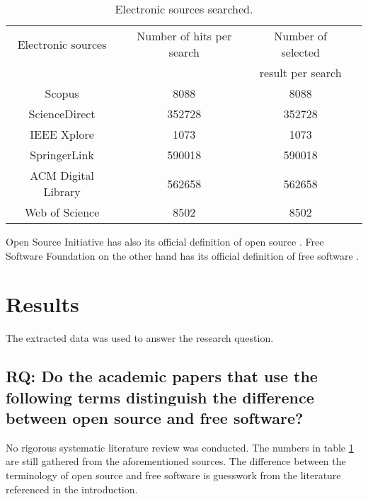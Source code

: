 \documentclass[conference]{IEEEtran}
\begin{document}
\begin{table}[htbp]
	\caption{Electronic sources searched.}
	\begin{center}
		\begin{tabular}{|c|c|c|c|}
			\hline
				Electronic sources & Number of hits per search & Number of selected\\
				&& result per search\\
			\hline
			Scopus & 8088 &  8088\\
			ScienceDirect & 352728 & 352728\\
			IEEE Xplore & 1073 & 1073\\
			SpringerLink & 590018 & 590018\\
			ACM Digital Library & 562658 & 562658\\
			Web of Science & 8502 & 8502\\
			\hline
		\end{tabular}
		\label{tab1}
	\end{center}
\end{table}

Open Source Initiative has also its official definition of open source \cite{osd}. Free Software Foundation on the other hand has its official definition of free software \cite{fsd}.

\section{Results}
The extracted data was used to answer the research question.
\subsection{RQ: Do the academic papers that use the following terms distinguish the difference between open source and free software?}
No rigorous systematic literature review was conducted. The numbers in table \ref{tab1} are still gathered from the aforementioned sources. The difference between the terminology of open source and free software is guesswork from the literature referenced in the introduction.
\end{document}
